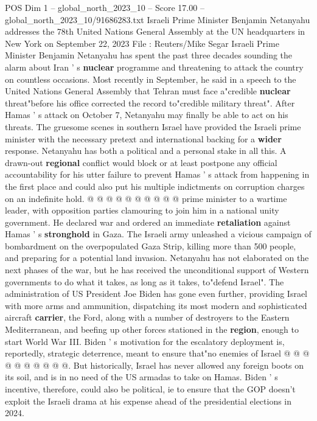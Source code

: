 \begin{textsample}{POS Dim 1 – global\_north\_2023\_10 – Score 17.00 – global\_north\_2023\_10/91686283.txt}  \label{ex:f1_pos_148}
Israeli Prime Minister Benjamin Netanyahu addresses the 78th United Nations General Assembly at the UN headquarters in New York on September 22, 2023 File : Reuters/Mike Segar Israeli Prime Minister Benjamin Netanyahu has spent the past three decades sounding the alarm about Iran ' s \textbf{nuclear} programme and threatening to attack the country on countless occasions.
Most recently in September, he said in a speech to the United Nations General Assembly that Tehran must face a"credible \textbf{nuclear} threat"before his office corrected the record to"credible military threat".
After Hamas ' s attack on October 7, Netanyahu may finally be able to act on his threats.
The gruesome scenes in southern Israel have provided the Israeli prime minister with the necessary pretext and international backing for a \textbf{wider} response.
Netanyahu has both a political and a personal stake in all this.
A drawn-out \textbf{regional} conflict would block or at least postpone any official accountability for his utter failure to prevent Hamas ' s attack from happening in the first place and could also put his multiple indictments on corruption charges on an indefinite hold. @ @ @ @ @ @ @ @ @ @ prime minister to a wartime leader, with opposition parties clamouring to join him in a national unity government.
He declared war and ordered an immediate \textbf{retaliation} against Hamas ' s \textbf{stronghold} in Gaza.
The Israeli army unleashed a vicious campaign of bombardment on the overpopulated Gaza Strip, killing more than 500 people, and preparing for a potential land invasion.
Netanyahu has not elaborated on the next phases of the war, but he has received the unconditional support of Western governments to do what it takes, as long as it takes, to"defend Israel".
The administration of US President Joe Biden has gone even further, providing Israel with more arms and ammunition, dispatching its most modern and sophisticated aircraft \textbf{carrier}, the Ford, along with a number of destroyers to the Eastern Mediterranean, and beefing up other forces stationed in the \textbf{region}, enough to start World War III.
Biden ' s motivation for the escalatory deployment is, reportedly, strategic deterrence, meant to ensure that"no enemies of Israel @ @ @ @ @ @ @ @ @ @.
But historically, Israel has never allowed any foreign boots on its soil, and is in no need of the US armadas to take on Hamas.
Biden ' s incentive, therefore, could also be political, ie to ensure that the GOP doesn't exploit the Israeli drama at his expense ahead of the presidential elections in 2024.

\end{textsample}

